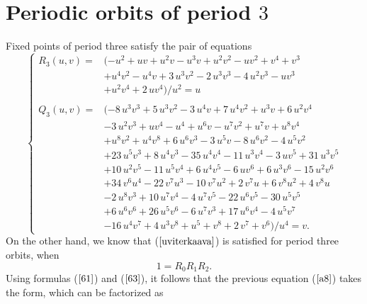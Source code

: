 \documentclass[12pt,a4paper]{amsart}
\numberwithin{equation}{section}
\numberwithin{lause}{section}
\begin{document}
\section{Periodic orbits of period $3$}
Fixed points of period three satisfy the pair of equations
\begin{equation}
\left\{\begin{array}{ll}
      R_{3}(u,v)=&(-{u}^{2}+uv+{u}^{2}v-{u}^{3}v+{u}^{2}{v}^{2}-u{v}^{2}+{v}^{4}+{v}^{3}\\
                  &+{u}^{4}{v}^{2}-{u}^{4}v+3\,{u}^{3}{v}^{2}-2\,{u}^{3}{v}^{3}-4\,{u}^{2}{v}^{3}-u{v}^{3} \\
                  &+{u}^{2}{v}^{4}+2\,u{v}^{4})/{u}^{2}=u \\ \\
      Q_{3}(u,v)=&(-8\,{u}^{3}{v}^{3}+5\,{u}^{3}{v}^{2}-3\,{u}^{4}v+7\,{u}^{4}{v}^{2}+{u}^{3}v+6\,{u}^{2}{v}^{4} \\
                &-3\,{u}^{2}{v}^{3}+u{v}^{4}-{u}^{4}+{u}^{6}v-{u}^{7}{v}^{2}+{u}^{7}v+{u}^{8}{v}^{4} \\
                &+{u}^{8}{v}^{2}+{u}^{4}{v}^{8}+6\,{u}^{6}{v}^{3}-3\,{u}^{5}v-8\,{u}^{6}{v}^{2}-4\,{u}^{5}{v}^{2} \\
                &+23\,{u}^{5}{v}^{3}+8\,{u}^{4}{v}^{3}-35\,{u}^{4}{v}^{4}-11\,{u}^{3}{v}^{4}-3\,u{v}^{5}+31\,{u}^{3}{v}^{5} \\
                &+10\,{u}^{2}{v}^{5}-11\,{u}^{5}{v}^{4}+6\,{u}^{4}{v}^{5}-6\,u{v}^{6}+6\,{u}^{3}{v}^{6}-15\,{u}^{2}{v}^{6} \\
                &+34\,{v}^{6}{u}^{4}-22\,{v}^{7}{u}^{3}-10\,{v}^{7}{u}^{2}+2\,{v}^{7}u+6\,{v}^{8}{u}^{2}+4\,{v}^{8}u\\
                &-2\,{u}^{8}{v}^{3}+10\,{u}^{7}{v}^{4}-4\,{u}^{7}{v}^{5}-22\,{u}^{6}{v}^{5}-30\,{u}^{5}{v}^{5}\\
                &+6\,{u}^{6}{v}^{6}+26\,{u}^{5}{v}^{6}-6\,{u}^{7}{v}^{3}+17\,{u}^{6}{v}^{4}-4\,{u}^{5}{v}^{7}\\
                &-16\,{u}^{4}{v}^{7}+4\,{u}^{3}{v}^{8}+{u}^{5}+{v}^{8}+2\,{v}^{7}+{v}^{6})/{u}^{4}=v.\label{8}
\end{array}\right.
\end{equation}
On the other hand, we know that ($\ref{uviterkaava}$) is satisfied for period three orbits, when
\begin{equation}
1=R_{0}R_{1}R_{2}.\label{a8}
\end{equation}
Using formulas ($\ref{61}$) and ($\ref{63}$), it follows that the previous equation ($\ref{a8}$) takes the form, which can be factorized as
 
\end{document}
